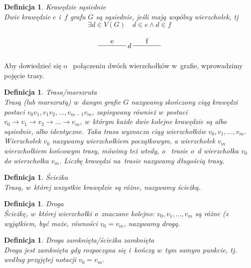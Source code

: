 \documentclass[12pt,a4paper]{report}
\newtheorem{definition}[theorem]{Definicja}
\begin{document}
\begin{definition}{Krawędzie sąsiednie \cite[Rozdział 2]{wilson2008}}\\
Dwie krawędzie $e$ i~$f$ grafu $G$ są sąsiednie, jeśli mają wspólny wierzchołek, tj
$$
\exists{d}\in V(G) \quad d \in e \land d\in f
$$

$$
\begin{tikzpicture}[scale=.7]
  \draw (-1.75,0)-- node[above] {f} ++(2,0);
  \draw node(d) at (-2,0) {$d$};
  \draw (-4.25,0) --node[above] {e} ++(2,0);
\end{tikzpicture}
$$
\end{definition}



Aby dowiedzieć się o~ połączeniu dwóch wierzchołków w~grafie, wprowadzimy pojęcie trasy.

\begin{definition}{Trasa/marszruta \cite[Rozdział 3]{wilson2008}}\\
Trasą (lub marszrutą) w~danym grafie $G$ nazywamy skończony ciąg krawędzi postaci \newline
$v_{0}v_{1}, v_{1}v_{2}, \ldots,v_{m-1}v_{m}$, zapisywany również w~postaci $v_{0} \rightarrow{} v_{1} \rightarrow{} v_{2} \rightarrow{} \ldots \rightarrow{} v_{m}$, w~którym każde dwie kolejne krawędzie są albo sąsiednie, albo identyczne. Taka trasa wyznacza ciąg wierzchołków $v_{0}, v_{1}, \ldots, v_{m}$. Wierzchołek $v_{0}$ nazywamy wierzchołkiem początkowym, a wierzchołek $v_{m}$ wierzchołkiem końcowym trasy, mówimy też wtedy, o~ trasie o~d wierzchołka $v_{0}$ do wierzchołka $v_{m}$. Liczbę krawędzi na~trasie nazywamy długością trasy. 
\end{definition}

\begin{definition}{Ścieżka \cite[Rozdział 3]{wilson2008}}\\
Trasą, w~której wszystkie krawędzie są różne, nazywamy ścieżką.
\end{definition}


\begin{definition}{Droga \cite[Rozdział 3]{wilson2008}}\\
Ścieżkę, w~której wierzchołki  o~znaczane kolejno: 
$v_{0}, v_{1}, \ldots, v_{m}$ są różne (z wyjątkiem, być może, równości $v_{0}=v_{m}$, nazywamy drogą. 
\end{definition}


\begin{definition}{Droga zamknięta/ścieżka zamknięta \cite[Rozdział 3]{wilson2008}}\\
Droga jest zamknięta gdy rozpoczyna się i~kończy w~tym samym punkcie, tj. według przyjętej notacji $v_{0}=v_{m}$.
\end{definition}
\end{document}
